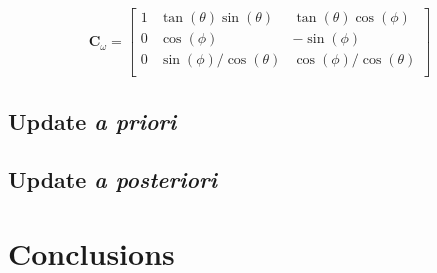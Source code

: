 \begin{equation}\label{eq:cOmega}
    \mathbf{C}_{\omega} =
    \begin{bmatrix}
        1 & \tan(\theta)\sin(\theta)   & \tan(\theta)\cos(\phi)     \\
        0 & \cos(\phi)                 & -\sin(\phi)                \\
        0 & {\sin(\phi)}/{\cos(\theta)} & {\cos(\phi)}/{\cos(\theta)} \\
    \end{bmatrix}
\end{equation}
\subsection{Update \textit{a priori}}
\subsection{Update \textit{a posteriori}}

\section{Conclusions}